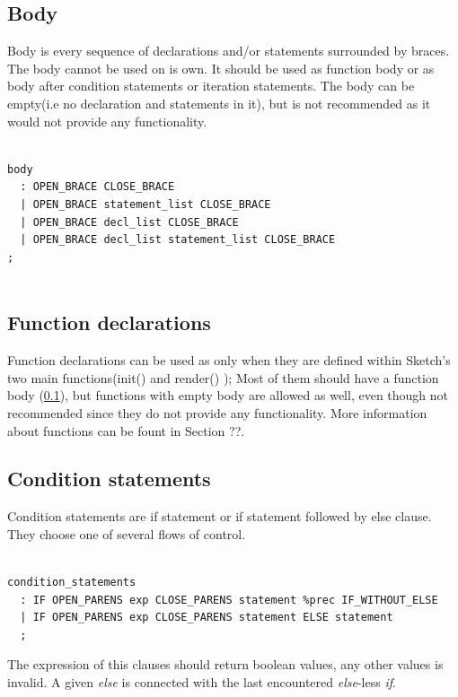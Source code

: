 \documentclass{l3proj}
\begin{document}
\subsection{Body}
\label{body}
Body is every sequence of declarations and/or statements surrounded by braces. The body cannot be used on is own. It should be used as  function body or as body after condition statements or iteration statements. The body can be empty(i.e no declaration and statements in it), but is not recommended as it would not provide any functionality. 
\begin{lstlisting}

body
  : OPEN_BRACE CLOSE_BRACE
  | OPEN_BRACE statement_list CLOSE_BRACE
  | OPEN_BRACE decl_list CLOSE_BRACE
  | OPEN_BRACE decl_list statement_list CLOSE_BRACE
;


\end{lstlisting}


\subsection{Function declarations}
Function declarations can be used as only when they are defined within Sketch's two main functions(init() and render() ); Most of them should have a function body (\ref{body}), but functions with empty body are allowed as well, even though not recommended since they do not provide any functionality. More information about functions can be fount in Section ??.

\subsection{Condition statements} 
Condition statements are if statement or if statement followed by else clause.  They choose one of several flows of control.
\begin{lstlisting}

condition_statements  
  : IF OPEN_PARENS exp CLOSE_PARENS statement %prec IF_WITHOUT_ELSE
  | IF OPEN_PARENS exp CLOSE_PARENS statement ELSE statement 
  ;
\end{lstlisting}

The expression of this clauses should return boolean values, any other values is invalid. A given \textit{else} is connected with the last encountered \textit{else}-less \textit{if}. 
\end{document}
